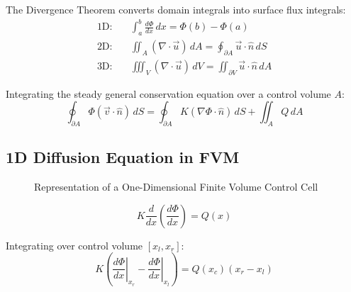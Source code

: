 \documentclass{article}
\begin{document}
The Divergence Theorem converts domain integrals into surface flux integrals:
\begin{align}
    \text{1D:} \quad & \int_a^b \frac{d\Phi}{dx} \, dx = \Phi(b) - \Phi(a)                                    \\
    \text{2D:} \quad & \iint_A (\nabla \cdot \vec{u}) \, dA = \oint_{\partial A} \vec{u} \cdot \hat{n} \, dS  \\
    \text{3D:} \quad & \iiint_V (\nabla \cdot \vec{u}) \, dV = \iint_{\partial V} \vec{u} \cdot \hat{n} \, dA
\end{align}

Integrating the steady general conservation equation over a control volume $A$:
\begin{equation}
    \oint_{\partial A} \Phi (\vec{v} \cdot \hat{n}) \, dS = \oint_{\partial A} K (\nabla \Phi \cdot \hat{n}) \, dS + \iint_A Q \, dA
\end{equation}

\subsection{1D Diffusion Equation in FVM}

\begin{figure}[H]
    \centering
    \caption{Representation of a One-Dimensional Finite Volume Control Cell}
\end{figure}

\begin{equation}
    K \frac{d}{dx}\left(\frac{d\Phi}{dx}\right) = Q(x)
\end{equation}

Integrating over control volume $[x_l, x_r]$:
\begin{equation}
    K \left( \left.\frac{d\Phi}{dx}\right|_{x_r} - \left.\frac{d\Phi}{dx}\right|_{x_l} \right) = Q(x_c) (x_r - x_l)
\end{equation}
\end{document}
